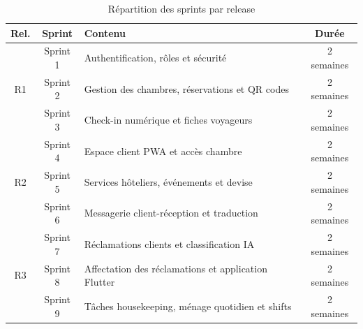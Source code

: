 \begin{table}[H]
\centering
\caption{Répartition des sprints par release}
\small
\begin{tabularx}{\textwidth}{|c|c|X|c|}
\hline
\textbf{Rel.} & \textbf{Sprint} & \textbf{Contenu} & \textbf{Durée} \\ \hline
\multirow{3}{*}{R1} & Sprint 1 & Authentification, rôles et sécurité & 2 semaines \\ \cline{2-4}
                     & Sprint 2 & Gestion des chambres, réservations et QR codes & 2 semaines \\ \cline{2-4}
                     & Sprint 3 & Check-in numérique et fiches voyageurs & 2 semaines \\ \hline
\multirow{3}{*}{R2} & Sprint 4 & Espace client PWA et accès chambre & 2 semaines \\ \cline{2-4}
                     & Sprint 5 & Services hôteliers, événements et devise & 2 semaines \\ \cline{2-4}
                     & Sprint 6 & Messagerie client-réception et traduction & 2 semaines \\ \hline
\multirow{3}{*}{R3} & Sprint 7 & Réclamations clients et classification IA & 2 semaines \\ \cline{2-4}
                     & Sprint 8 & Affectation des réclamations et application Flutter & 2 semaines \\ \cline{2-4}
                     & Sprint 9 & Tâches housekeeping, ménage quotidien et shifts & 2 semaines \\ \hline
\end{tabularx}
\label{tab:sprints_par_release}
\end{table}
\FloatBarrier

